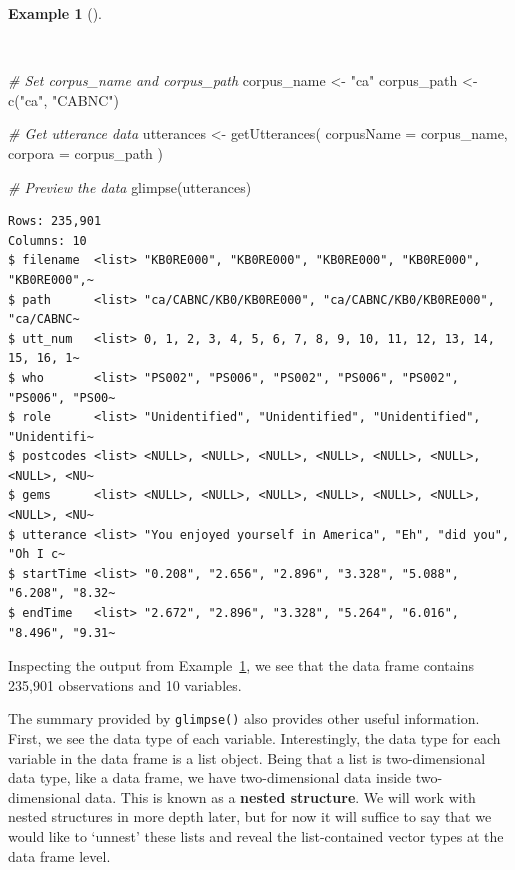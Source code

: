 \documentclass[
  letterpaper,
  krantz1]{latex/krantz-mod}
\newenvironment{Shaded}{\begin{snugshade}}{\end{snugshade}}
\newcommand{\AttributeTok}[1]{\textcolor[rgb]{0.00,0.00,0.00}{#1}}
\newcommand{\CommentTok}[1]{\textcolor[rgb]{0.00,0.00,0.00}{\textit{#1}}}
\newcommand{\FunctionTok}[1]{\textcolor[rgb]{0.00,0.00,0.00}{#1}}
\newcommand{\NormalTok}[1]{\textcolor[rgb]{0.00,0.00,0.00}{#1}}
\newcommand{\OtherTok}[1]{\textcolor[rgb]{0.00,0.00,0.00}{#1}}
\newcommand{\StringTok}[1]{\textcolor[rgb]{0.00,0.00,0.00}{#1}}
\theoremstyle{definition}
\newtheorem{example}{Example}[chapter]
\theoremstyle{definition}
\theoremstyle{remark}
\begin{document}
\begin{example}[]\protect\hypertarget{exm-acquire-get-utterances}{}\label{exm-acquire-get-utterances}

~

\begin{Shaded}
\begin{Highlighting}[numbers=left,,]
\CommentTok{\# Set corpus\_name and corpus\_path}
\NormalTok{corpus\_name }\OtherTok{\textless{}{-}} \StringTok{"ca"}
\NormalTok{corpus\_path }\OtherTok{\textless{}{-}} \FunctionTok{c}\NormalTok{(}\StringTok{"ca"}\NormalTok{, }\StringTok{"CABNC"}\NormalTok{)}

\CommentTok{\# Get utterance data}
\NormalTok{utterances }\OtherTok{\textless{}{-}}
  \FunctionTok{getUtterances}\NormalTok{(}
    \AttributeTok{corpusName =}\NormalTok{ corpus\_name,}
    \AttributeTok{corpora =}\NormalTok{ corpus\_path}
\NormalTok{    )}

\CommentTok{\# Preview the data}
\FunctionTok{glimpse}\NormalTok{(utterances)}
\end{Highlighting}
\end{Shaded}

\begin{verbatim}
Rows: 235,901
Columns: 10
$ filename  <list> "KB0RE000", "KB0RE000", "KB0RE000", "KB0RE000", "KB0RE000",~
$ path      <list> "ca/CABNC/KB0/KB0RE000", "ca/CABNC/KB0/KB0RE000", "ca/CABNC~
$ utt_num   <list> 0, 1, 2, 3, 4, 5, 6, 7, 8, 9, 10, 11, 12, 13, 14, 15, 16, 1~
$ who       <list> "PS002", "PS006", "PS002", "PS006", "PS002", "PS006", "PS00~
$ role      <list> "Unidentified", "Unidentified", "Unidentified", "Unidentifi~
$ postcodes <list> <NULL>, <NULL>, <NULL>, <NULL>, <NULL>, <NULL>, <NULL>, <NU~
$ gems      <list> <NULL>, <NULL>, <NULL>, <NULL>, <NULL>, <NULL>, <NULL>, <NU~
$ utterance <list> "You enjoyed yourself in America", "Eh", "did you", "Oh I c~
$ startTime <list> "0.208", "2.656", "2.896", "3.328", "5.088", "6.208", "8.32~
$ endTime   <list> "2.672", "2.896", "3.328", "5.264", "6.016", "8.496", "9.31~
\end{verbatim}

\end{example}

Inspecting the output from Example~\ref{exm-acquire-get-utterances}, we
see that the data frame contains 235,901 observations and 10 variables.

The summary provided by \texttt{glimpse()} also provides other useful
information. First, we see the data type of each variable.
Interestingly, the data type for each variable in the data frame is a
list object. Being that a list is two-dimensional data type, like a data
frame, we have two-dimensional data inside two-dimensional data. This is
known as a \textbf{nested structure}. We will work with nested
structures in more depth later, but for now it will suffice to say that
we would like to `unnest' these lists and reveal the list-contained
vector types at the data frame level.
\end{document}
